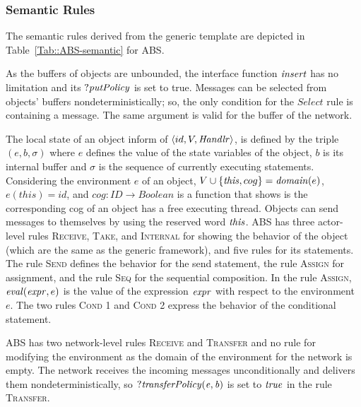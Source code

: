 


\subsubsection{Semantic Rules}
The semantic rules derived from the generic template are depicted in Table~\ref{Tab::ABS-semantic} for ABS.

As the buffers of objects are unbounded, the interface function $\mathit{insert}$ has no limitation and its $?{\it putPolicy}$ is set to true. Messages can be selected from objects' buffers nondeterministically; so, the only condition for the $Select$ rule is containing a message. The same argument is valid for the buffer of the network.

The local state of an object inform of $\langle id, V, \mathit{Handlr}\rangle$, is defined by the triple $(e,b, \sigma)$ where $e$ defines the value of the state variables of the object, $b$ is its internal buffer and $\sigma$ is the sequence of currently executing statements. Considering the environment $e$ of an object, $V\cup\{\mathit{this}, cog\}=\mathit{domain}(e)$, $e(\mathit{this})=id$, and $cog:ID\rightarrow Boolean$ is a function that shows is the corresponding cog of an object has a free executing thread.  %
Objects can send messages to themselves by using the reserved word $\it this$. ABS has three actor-level rules \textsc{Receive}, \textsc{Take}, and \textsc{Internal} for showing the behavior of the object (which are the same as the generic framework), and five rules for its statements. The rule \textsc{Send} defines the behavior for the send statement, the rule \textsc{Assign} for assignment, and the rule \textsc{Seq} for the sequential composition. In the rule \textsc{Assign}, $\mathit{eval}(\mathit{expr},e)$ is the value of the expression $\mathit{expr}$ with respect to the environment $e$. The two rules \textsc{Cond 1} and \textsc{Cond 2} express the behavior of the conditional statement. 

ABS has two network-level rules \textsc{Receive} and \textsc{Transfer} and no rule for modifying the environment as the domain of the environment for the network is empty. The network receives the incoming messages unconditionally and delivers them nondeterministically, so $?{\it transferPolicy(e,b)}$ is set to $\mathit{true}$ in the rule \textsc{Transfer}.

